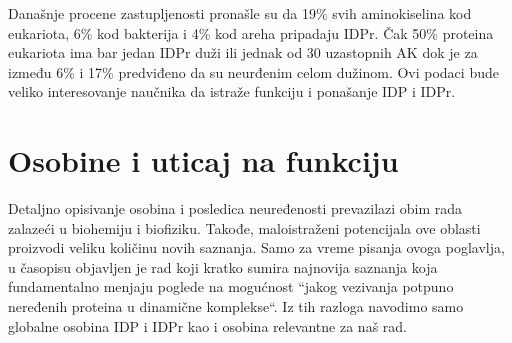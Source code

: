 Današnje procene zastupljenosti pronašle su da 19\% svih aminokiselina kod
eukariota, 6\% kod bakterija i 4\% kod areha pripadaju
IDPr\parencite{peng2015b}.  Čak 50\% proteina eukariota ima bar jedan IDPr duži
ili jednak od 30 uzastopnih AK\parencite{Xue2012} dok je za između 6\% i 17\%
predviđeno da su neurđenim celom dužinom\parencite{tompa2002}.  Ovi podaci bude
veliko interesovanje naučnika da istraže funkciju i ponašanje IDP i IDPr.

\section {Osobine i uticaj na funkciju}

Detaljno opisivanje osobina i posledica neuređenosti prevazilazi obim rada
zalazeći u biohemiju i biofiziku. Takođe, maloistraženi potencijala ove oblasti
proizvodi veliku količinu novih saznanja. Samo za vreme pisanja ovoga
poglavlja, u časopisu  objavljen je rad\parencite{rebecca2018} koji
kratko sumira najnovija saznanja koja fundamentalno menjaju poglede na
mogućnost ``jakog vezivanja potpuno neređenih proteina u dinamične komplekse``.
Iz tih razloga navodimo samo globalne osobina IDP i IDPr kao i osobina
relevantne za naš rad.

